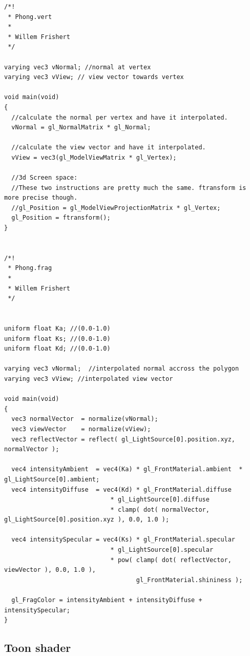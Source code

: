 \documentclass[a4paper,12pt]{article}
\newenvironment{mylisting}
{\begin{list}{}{\setlength{\leftmargin}{1em}}\item\scriptsize\bfseries}
{\end{list}}
\begin{document}
\begin{mylisting}
	\begin{verbatim}
/*!
 * Phong.vert
 * 
 * Willem Frishert
 */

varying vec3 vNormal; //normal at vertex
varying vec3 vView; // view vector towards vertex

void main(void)
{
  //calculate the normal per vertex and have it interpolated.
  vNormal = gl_NormalMatrix * gl_Normal;

  //calculate the view vector and have it interpolated.
  vView = vec3(gl_ModelViewMatrix * gl_Vertex);
  
  //3d Screen space:
  //These two instructions are pretty much the same. ftransform is more precise though.
  //gl_Position = gl_ModelViewProjectionMatrix * gl_Vertex;
  gl_Position = ftransform();
}


/*!
 * Phong.frag
 * 
 * Willem Frishert
 */


uniform float Ka; //(0.0-1.0)
uniform float Ks; //(0.0-1.0)
uniform float Kd; //(0.0-1.0)

varying vec3 vNormal;  //interpolated normal accross the polygon
varying vec3 vView; //interpolated view vector

void main(void)
{
  vec3 normalVector  = normalize(vNormal);
  vec3 viewVector    = normalize(vView);
  vec3 reflectVector = reflect( gl_LightSource[0].position.xyz, normalVector ); 

  vec4 intensityAmbient  = vec4(Ka) * gl_FrontMaterial.ambient  * gl_LightSource[0].ambient;
  vec4 intensityDiffuse  = vec4(Kd) * gl_FrontMaterial.diffuse
                             * gl_LightSource[0].diffuse
                             * clamp( dot( normalVector, gl_LightSource[0].position.xyz ), 0.0, 1.0 );
                                    
  vec4 intensitySpecular = vec4(Ks) * gl_FrontMaterial.specular 
                             * gl_LightSource[0].specular
                             * pow( clamp( dot( reflectVector, viewVector ), 0.0, 1.0 ),
                                    gl_FrontMaterial.shininess );

  gl_FragColor = intensityAmbient + intensityDiffuse + intensitySpecular;
}

	\end{verbatim}
\end{mylisting}

\pagebreak[4]

\subsection{Toon shader}
\label{sec:ToonShaderSource}
\end{document}

